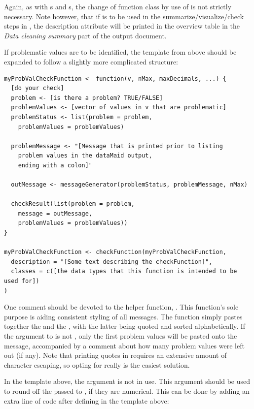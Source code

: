 \documentclass[article,shortnames]{jss}
\begin{document}
Again, as with s and s, the
change of function class by use of  is not strictly
necessary. Note however, that if  is to be
used in the summarize/visualize/check steps in , the
description attribute will be printed in the overview table in the
\textit{Data cleaning summary} part of the output document.

If problematic values are to be identified, the template from above
should be expanded to follow a slightly more complicated structure:

\begin{Verbatim}
myProbValCheckFunction <- function(v, nMax, maxDecimals, ...) {
  [do your check]
  problem <- [is there a problem? TRUE/FALSE]
  problemValues <- [vector of values in v that are problematic]
  problemStatus <- list(problem = problem,
    problemValues = problemValues)
  
  problemMessage <- "[Message that is printed prior to listing
    problem values in the dataMaid output,
    ending with a colon]"

  outMessage <- messageGenerator(problemStatus, problemMessage, nMax)

  checkResult(list(problem = problem,
    message = outMessage,
	problemValues = problemValues))
}

myProbValCheckFunction <- checkFunction(myProbValCheckFunction,
  description = "[Some text describing the checkFunction]",
  classes = c([the data types that this function is intended to be used for])
)
\end{Verbatim}

One comment should be devoted to the helper function,
.  This function's sole purpose is aiding
consistent styling of all  messages. The function
simply pastes together the  and the
, with the latter being quoted and sorted
alphabetically. If the  argument to  is
not , only the first  problem values will be pasted
onto the message, accompanied by a comment about how many problem
values were left out (if any).  Note that printing quotes in
 requires an extensive amount of character escaping, so
opting for  really is the easiest solution.

In the template above, the argument  is not in use. This
argument should be used to round off the  passed to
, if they are numerical.  This can be done by
adding an extra line of code after defining  in the template
above:
\end{document}
